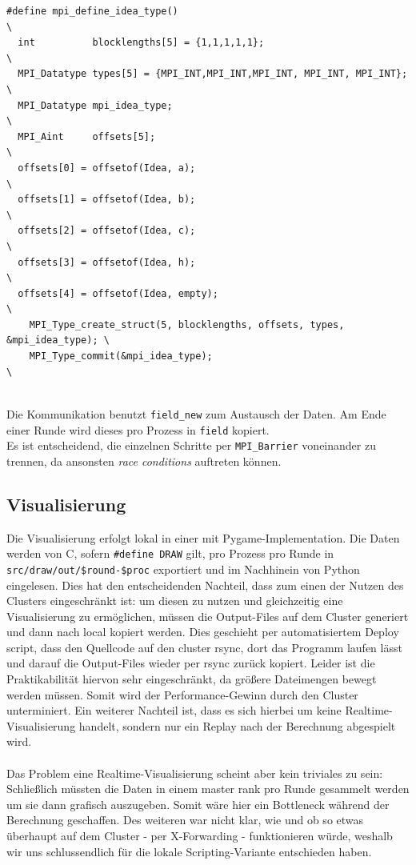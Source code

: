 \begin{verbatim}
#define mpi_define_idea_type()                                               \
  int          blocklengths[5] = {1,1,1,1,1};                                \
  MPI_Datatype types[5] = {MPI_INT,MPI_INT,MPI_INT, MPI_INT, MPI_INT};       \
  MPI_Datatype mpi_idea_type;                                                \
  MPI_Aint     offsets[5];                                                   \
  offsets[0] = offsetof(Idea, a);                                            \
  offsets[1] = offsetof(Idea, b);                                            \
  offsets[2] = offsetof(Idea, c);                                            \
  offsets[3] = offsetof(Idea, h);                                            \
  offsets[4] = offsetof(Idea, empty);                                        \
    MPI_Type_create_struct(5, blocklengths, offsets, types, &mpi_idea_type); \
    MPI_Type_commit(&mpi_idea_type);                                         \
\end{verbatim}
\quad \\
Die Kommunikation benutzt \texttt{field\_new} zum Austausch der Daten. Am Ende einer Runde wird dieses pro Prozess in \texttt{field} kopiert. \\
Es ist entscheidend, die einzelnen Schritte per \texttt{MPI\_Barrier} voneinander zu trennen, da ansonsten \textit{race conditions} auftreten können.

\subsection{Visualisierung}
Die Visualisierung erfolgt lokal in einer mit Pygame-Implementation. 
Die Daten werden von C, sofern \texttt{\#define DRAW} gilt, pro Prozess pro Runde in \texttt{src/draw/out/\$round-\$proc} exportiert und im Nachhinein von Python eingelesen. 
Dies hat den entscheidenden Nachteil, dass zum einen der Nutzen des Clusters eingeschränkt ist: 
um diesen zu nutzen und gleichzeitig eine Visualisierung zu ermöglichen, müssen die Output-Files auf dem Cluster generiert und dann nach local kopiert werden. 
Dies geschieht per automatisiertem Deploy script, dass den Quellcode auf den cluster rsync, dort das Programm laufen lässt und darauf die Output-Files wieder per rsync zurück kopiert.
Leider ist die Praktikabilität hiervon sehr eingeschränkt, da größere Dateimengen bewegt werden müssen. 
Somit wird der Performance-Gewinn durch den Cluster unterminiert.
Ein weiterer Nachteil ist, dass es sich hierbei um keine Realtime-Visualisierung handelt, sondern nur ein Replay nach der Berechnung abgespielt wird. \\
\quad \\
Das Problem eine Realtime-Visualisierung scheint aber kein triviales zu sein: 
Schließlich müssten die Daten in einem master rank pro Runde gesammelt werden um sie dann grafisch auszugeben. 
Somit wäre hier ein Bottleneck während der Berechnung geschaffen.
Des weiteren war nicht klar, wie und ob so etwas überhaupt auf dem Cluster - per X-Forwarding - funktionieren würde, weshalb wir uns schlussendlich für die lokale Scripting-Variante entschieden haben.
\newpage

